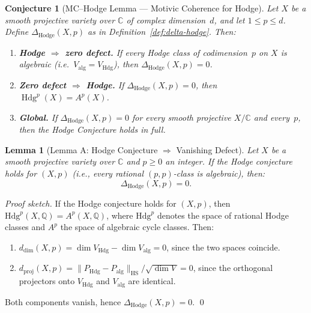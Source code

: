 \documentclass[11pt]{article}
\newtheorem{lemma}[theorem]{Lemma}
\newtheorem{conjecture}[theorem]{Conjecture}
\theoremstyle{definition}
\DeclareMathOperator{\Hdg}{Hdg}
\begin{document}

\begin{conjecture}[MC--Hodge Lemma --- Motivic Coherence for Hodge]
\label{conj:mc-hodge}
Let $X$ be a smooth projective variety over $\mathbb{C}$ of complex
dimension~$d$, and let $1\le p\le d$.  Define
$\Delta_{\mathrm{Hodge}}(X,p)$ as in
Definition~\textup{\ref{def:delta-hodge}}.  Then:
\begin{enumerate}[label=\textup{(\arabic*)}]
  \item \textbf{Hodge $\Rightarrow$ zero defect.}\;
        If every Hodge class of codimension~$p$ on $X$ is algebraic
        (i.e.\ $V_{\mathrm{alg}}=V_{\mathrm{Hdg}}$), then
        $\Delta_{\mathrm{Hodge}}(X,p)=0$.
  \item \textbf{Zero defect $\Rightarrow$ Hodge.}\;
        If $\Delta_{\mathrm{Hodge}}(X,p)=0$, then
        $\Hdg^{p}(X)=A^{p}(X)$.
  \item \textbf{Global.}\;
        If $\Delta_{\mathrm{Hodge}}(X,p)=0$ for every smooth
        projective $X/\mathbb{C}$ and every~$p$, then the Hodge
        Conjecture holds in full.
\end{enumerate}
\end{conjecture}


\begin{lemma}[Lemma A: Hodge Conjecture $\Rightarrow$ Vanishing Defect]
\label{lem:hodge-A}
Let $X$ be a smooth projective variety over $\mathbb{C}$ and $p \geq 0$ an integer. If the Hodge conjecture holds for $(X, p)$ (i.e., every rational $(p,p)$-class is algebraic), then:
\[
  \Delta_{\mathrm{Hodge}}(X, p) = 0.
\]
\end{lemma}

\begin{proof}[Proof sketch]
If the Hodge conjecture holds for $(X, p)$, then $\mathrm{Hdg}^p(X, \mathbb{Q}) = A^p(X, \mathbb{Q})$, where $\mathrm{Hdg}^p$ denotes the space of rational Hodge classes and $A^p$ the space of algebraic cycle classes. Then:
\begin{enumerate}
  \item $d_{\mathrm{dim}}(X, p) = \dim V_{\mathrm{Hdg}} - \dim V_{\mathrm{alg}} = 0$, since the two spaces coincide.
  \item $d_{\mathrm{proj}}(X, p) = \|P_{\mathrm{Hdg}} - P_{\mathrm{alg}}\|_{\mathrm{HS}} / \sqrt{\dim V} = 0$, since the orthogonal projectors onto $V_{\mathrm{Hdg}}$ and $V_{\mathrm{alg}}$ are identical.
\end{enumerate}
Both components vanish, hence $\Delta_{\mathrm{Hodge}}(X, p) = 0$. \qed
\end{proof}
\end{document}
